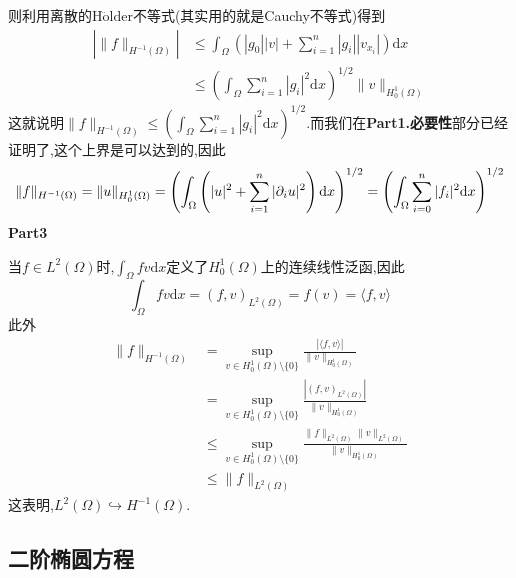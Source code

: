 则利用离散的$\mathrm{H\ddot{o} lder}$不等式(其实用的就是Cauchy不等式)得到
$$
\begin{aligned}
    |\|f\|_{H^{-1}(\Omega)}| &\leqslant \int_\Omega\left(|g_0||v|+\sum^{n}_{i=1}|g_i||v_{x_i}|\right)\mathrm{d}x\\
                             &\leqslant \left(\int_{\Omega}\sum_{i=1}^n|g_i|^2\mathrm{d}x\right)^{1/2}\|v\|_{H^1_0(\Omega)}
\end{aligned}
$$
这就说明$\|f\|_{H^{-1}(\Omega)}\leqslant \left(\int_{\Omega}\sum_{i=1}^n|g_i|^2\mathrm{d}x\right)^{1/2}$.而我们在\textbf{Part1.必要性}部分已经证明了,这个上界是可以达到的,因此
$$
\|f\|_{H^{-1}(\Omega)}=\|u\|_{H^1_0(\Omega)}=\left(\int_{\Omega}\left(|u|^2+\sum_{i=1}^n|\partial_i u|^2\right)\mathrm{d}x\right)^{1/2}=\left(\int_{\Omega}\sum_{i=0}^n|f_i|^2\mathrm{d}x\right)^{1/2}
$$
\qquad \textbf{Part3}\par
当$f\in L^2(\Omega)$时,$\int_{\Omega}fv\mathrm{d}x$定义了$H^1_0(\Omega)$上的连续线性泛函,因此
$$
\int_{\Omega}fv\mathrm{d}x=(f,v)_{L^2(\Omega)}=f(v)=\langle f,v\rangle
$$
此外
$$
\begin{aligned}
    \|f\|_{H^{-1}(\Omega)} &= \sup\limits_{v\in H^1_0(\Omega)\setminus \{0\}}\frac{\left|\langle f,v\rangle\right|}{\|v\|_{H^1_0(\Omega)}}\\
                           &= \sup\limits_{v\in H^1_0(\Omega)\setminus \{0\}}\frac{\left|(f,v)_{L^2(\Omega)}\right|}{\|v\|_{H^1_0(\Omega)}}\\
                           &\leqslant \sup\limits_{v\in H^1_0(\Omega)\setminus \{0\}}\frac{\|f\|_{L^2(\Omega)}\|v\|_{L^2(\Omega)}}{\|v\|_{H^1_0(\Omega)}}\\
                           &\leqslant \|f\|_{L^2(\Omega)}
\end{aligned}
$$
这表明,$L^2(\Omega)\hookrightarrow H^{-1}(\Omega)$.
\subsection{二阶椭圆方程}